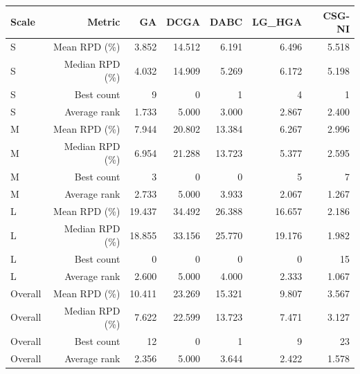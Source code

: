 \begin{tabular}{lrrrrrr}
\toprule
Scale & Metric & GA & DCGA & DABC & LG\_HGA & CSG-NI \\
\midrule
S & Mean RPD (\%) & 3.852 & 14.512 & 6.191 & 6.496 & 5.518 \\
S & Median RPD (\%) & 4.032 & 14.909 & 5.269 & 6.172 & 5.198 \\
S & Best count & 9 & 0 & 1 & 4 & 1 \\
S & Average rank & 1.733 & 5.000 & 3.000 & 2.867 & 2.400 \\
M & Mean RPD (\%) & 7.944 & 20.802 & 13.384 & 6.267 & 2.996 \\
M & Median RPD (\%) & 6.954 & 21.288 & 13.723 & 5.377 & 2.595 \\
M & Best count & 3 & 0 & 0 & 5 & 7 \\
M & Average rank & 2.733 & 5.000 & 3.933 & 2.067 & 1.267 \\
L & Mean RPD (\%) & 19.437 & 34.492 & 26.388 & 16.657 & 2.186 \\
L & Median RPD (\%) & 18.855 & 33.156 & 25.770 & 19.176 & 1.982 \\
L & Best count & 0 & 0 & 0 & 0 & 15 \\
L & Average rank & 2.600 & 5.000 & 4.000 & 2.333 & 1.067 \\
Overall & Mean RPD (\%) & 10.411 & 23.269 & 15.321 & 9.807 & 3.567 \\
Overall & Median RPD (\%) & 7.622 & 22.599 & 13.723 & 7.471 & 3.127 \\
Overall & Best count & 12 & 0 & 1 & 9 & 23 \\
Overall & Average rank & 2.356 & 5.000 & 3.644 & 2.422 & 1.578 \\
\bottomrule
\end{tabular}
